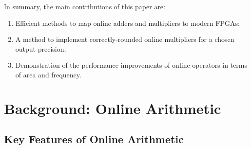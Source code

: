 \documentclass[conference]{IEEEtran}
\begin{document}
In summary, the main contributions of this paper are:\vspace{-0.5ex}
\begin{enumerate}
    \item Efficient methods to map online adders and multipliers to modern FPGAs;
    \item A method to implement correctly-rounded online multipliers for a chosen output precision;
    \item Demonstration of the performance improvements of online operators in terms of area and frequency.
\end{enumerate}\vspace{-1ex}


\section{Background: Online Arithmetic}\label{Sec:Background}\vspace{-0.5ex}
\subsection{Key Features of Online Arithmetic}\vspace{-0.5ex}
\end{document}
